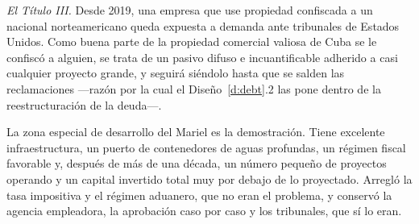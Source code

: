 \emph{El Título III.} Desde 2019, una empresa que use propiedad confiscada a un nacional
norteamericano queda expuesta a demanda ante tribunales de Estados Unidos. Como buena parte de
la propiedad comercial valiosa de Cuba se le confiscó a alguien, se trata de un pasivo difuso e
incuantificable adherido a casi cualquier proyecto grande, y seguirá siéndolo hasta que se
salden las reclamaciones ---razón por la cual el Diseño~\ref{d:debt}.2 las pone dentro de la
reestructuración de la deuda---.

La zona especial de desarrollo del Mariel es la demostración. Tiene excelente
infraestructura, un puerto de contenedores de aguas profundas, un régimen fiscal favorable y,
después de más de una década, un número pequeño de proyectos operando \citep{feinberg2016} y un
capital invertido total muy por debajo de lo proyectado. Arregló la tasa impositiva y el régimen
aduanero, que no eran el problema, y conservó la agencia empleadora, la aprobación caso por caso
y los tribunales, que sí lo eran.

